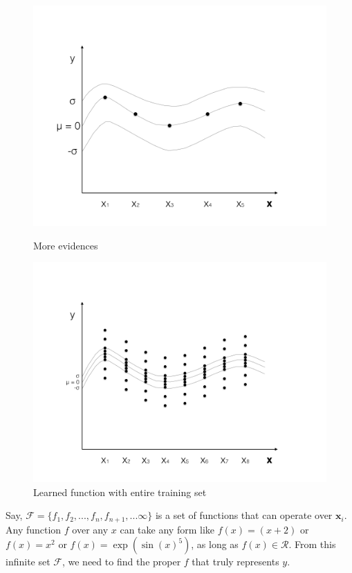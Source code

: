 \documentclass[english]{tktltiki}
\begin{document}
\begin{figure}[h!]
\begin{minipage}{.5\linewidth}
  \centering
  \includegraphics[width=\linewidth]{figures/GP_3.png}
  \caption{More evidences}
  \label{fig:sub1}
\end{minipage}%
\begin{minipage}{.5\linewidth}
  \centering
  \includegraphics[width=\linewidth]{figures/GP_4.png}
  \caption{Learned function with entire training set}
  \label{fig:sub2}
\end{minipage}

\label{fig:test}
\end{figure}

Say, $\mathcal{F} = \{f_1, f_2, ..., f_n, f_{n+1}, ... \infty\}$ is a set of functions that can operate over $\mathbf{x}_i$. Any function $f$ over any $x$ can take any form like $f(x) = (x + 2)$ or $f(x) = x^2$ or $f(x) = \exp(\sin(x)^5)$, as long as $f(x) \in \mathcal{R}$. From this infinite set $\mathcal{F}$, we need to find the proper $f$ that truly represents $y$.
\end{document}
